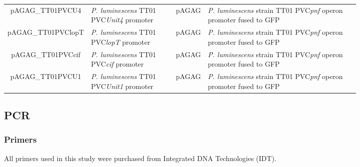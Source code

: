 \begin{landscape}
\begin{tabularx}{\linewidth}{ c >{\centering\arraybackslash} m{0.26\linewidth} >{\centering} m{0.08\linewidth} m{0.48\linewidth} }
pAGAG\_TT01PVCU4 & \emph{P. luminescens} TT01 PVC\emph{Unit4} promoter & pAGAG & \emph{P. luminescens} strain TT01 PVC\emph{pnf} operon promoter fused to GFP\\

pAGAG\_TT01PVClopT & \emph{P. luminescens} TT01 PVC\emph{lopT} promoter & pAGAG & \emph{P. luminescens} strain TT01 PVC\emph{pnf} operon promoter fused to GFP\\

pAGAG\_TT01PVCcif & \emph{P. luminescens} TT01 PVC\emph{cif} promoter & pAGAG & \emph{P. luminescens} strain TT01 PVC\emph{pnf} operon promoter fused to GFP\\

pAGAG\_TT01PVCU1 & \emph{P. luminescens} TT01 PVC\emph{Unit1} promoter & pAGAG & \emph{P. luminescens} strain TT01 PVC\emph{pnf} operon promoter fused to GFP\\

\end{tabularx}

\end{landscape}

\subsection{PCR}
	\subsubsection{Primers}\label{primers}
	All primers used in this study were purchased from Integrated DNA Technologies (IDT).

